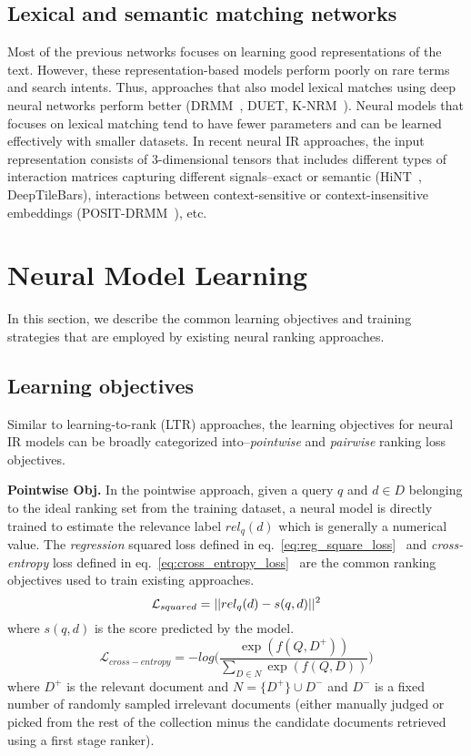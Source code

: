 \subsection{Lexical and semantic matching networks}
Most of the previous networks focuses on learning good representations of the text. However, these representation-based models perform poorly on rare terms and search intents. Thus, approaches that also model lexical matches using deep neural networks perform better (DRMM~\citep{Guo2016}, DUET, K-NRM~\citep{KNRM17}). Neural models that focuses on lexical matching tend to have fewer parameters and can be learned effectively with smaller datasets. In recent neural IR approaches, the input representation consists of 3-dimensional tensors that includes different types of interaction matrices capturing different signals--exact or semantic (HiNT~\citep{Fan_hint_2018}, DeepTileBars), interactions between context-sensitive or context-insensitive embeddings (POSIT-DRMM~\citep{pacrr_drmm_18}), etc.

\section{Neural Model Learning}
\label{sec:nn_model_learning}
In this section, we describe the common learning objectives and training strategies that are employed by existing neural ranking approaches.

\subsection{Learning objectives}
Similar to learning-to-rank (LTR) approaches, the learning objectives for neural IR models can be broadly categorized into--\textit{pointwise} and \textit{pairwise} ranking loss objectives.

\textbf{Pointwise Obj.} In the pointwise approach, given a query $q$ and $d \in D$ belonging to the ideal ranking set from the training dataset, a neural model is directly trained to estimate the relevance label $rel_q(d)$ which is generally a numerical value. The \textit{regression} squared loss defined in eq.~\ref{eq:reg_square_loss}~\citep{Dehghani_sigir17} and \textit{cross-entropy} loss defined in eq.~\ref{eq:cross_entropy_loss}~\citep{dssm13, Mitra2017a, co_pacrr_wsdm18} are the common ranking objectives used to train existing approaches.
\begin{equation}\label{eq:reg_square_loss}
    \mathcal{L}_{squared} = ||rel_q(d) - s(q,d)||^2\\
\end{equation}
where $s(q, d)$ is the score predicted by the model.
\begin{equation}\label{eq:cross_entropy_loss}
    \mathcal{L}_{cross-entropy} = -log\Big(\frac{\exp (f(Q,D^+))}{\sum_{D \in N} \exp (f(Q,D))}\Big)
\end{equation}
where $D^+$ is the relevant document and $N = \{D^+\} \cup D^-$ and $D^-$ is a fixed number of randomly sampled irrelevant documents (either manually judged or picked from the rest of the collection minus the candidate documents retrieved using a first stage ranker).

